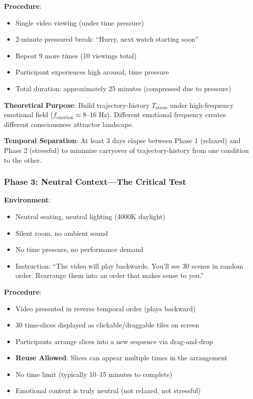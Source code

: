 \documentclass[12pt,a4paper]{article}
\theoremstyle{definition}
\begin{document}
\textbf{Procedure}:
\begin{itemize}
  \item Single video viewing (under time pressure)
  \item 2-minute pressured break: ``Hurry, next watch starting soon''
  \item Repeat 9 more times (10 viewings total)
  \item Participant experiences high arousal, time pressure
  \item Total duration: approximately 25 minutes (compressed due to pressure)
\end{itemize}

\textbf{Theoretical Purpose}: Build trajectory-history $T_{\text{stress}}$ under high-frequency emotional field ($f_{\text{emotion}} \approx 8$--$16$ Hz). Different emotional frequency creates different consciousness attractor landscape.

\textbf{Temporal Separation}: At least 3 days elapse between Phase 1 (relaxed) and Phase 2 (stressful) to minimize carryover of trajectory-history from one condition to the other.

\subsubsection{Phase 3: Neutral Context---The Critical Test}

\textbf{Environment}:
\begin{itemize}
  \item Neutral seating, neutral lighting (4000K daylight)
  \item Silent room, no ambient sound
  \item No time pressure, no performance demand
  \item Instruction: ``The video will play backwards. You'll see 30 scenes in random order. Rearrange them into an order that makes sense to you.''
\end{itemize}

\textbf{Procedure}:
\begin{itemize}
  \item Video presented in reverse temporal order (plays backward)
  \item 30 time-slices displayed as clickable/draggable tiles on screen
  \item Participants arrange slices into a new sequence via drag-and-drop
  \item \textbf{Reuse Allowed}: Slices can appear multiple times in the arrangement
  \item No time limit (typically 10--15 minutes to complete)
  \item Emotional context is truly neutral (not relaxed, not stressful)
\end{itemize}
\end{document}
